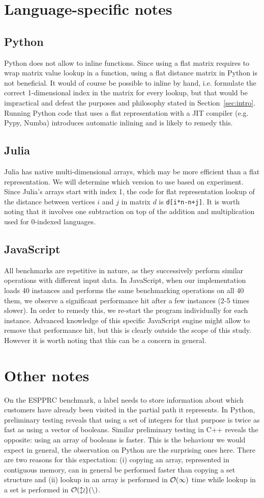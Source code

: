 \documentclass[11pt,a4paper,notitlepage]{article}
\begin{document}
\section{Language-specific notes}
\subsection{Python}
Python does not allow to inline functions. Since using a flat matrix
requires to wrap matrix value lookup in a function, using a flat distance
matrix in Python is not beneficial. It would of course be possible to
inline by hand, i.e. formulate the correct 1-dimensional index in the
matrix for every lookup, but that would be impractical and defeat the
purposes and philosophy stated in Section~\ref{sec:intro}.
Running Python code that uses a flat representation with a JIT compiler
(e.g. Pypy, Numba) introduces automatic inlining and is likely to
remedy this.
\subsection{Julia}
Julia has native multi-dimensional arrays, which may be more efficient
than a flat representation. We will determine which version to use
based on experiment. Since Julia's arrays start with index 1, the code
for flat representation lookup of the distance between vertices $i$
and $j$ in matrix $d$ is \lstinline{d[i*n-n+j]}. It is worth noting
that it involves one subtraction on top of the addition and
multiplication used for 0-indexed languages.
\subsection{JavaScript}
All benchmarks are repetitive in nature, as they successively perform similar
operations with different input data. In JavaScript, when our
implementation loads 40 instances and performs the same
benchmarking operations on all 40 them, we observe a significant performance
hit after a few instances (2-5 times slower). In order to remedy this,
we re-start the program individually for each instance. Advanced
knowledge of this specific JavaScript engine might allow to remove that
performance hit, but this is clearly outside the scope of this
study. However it is worth noting that this can be a concern in general.

\section{Other notes}
On the ESPPRC benchmark, a label needs to store information about
which customers have already been visited in the partial path it
represents. In Python, preliminary testing reveals that using a set of
integers for that purpose is twice as fast as using a vector of
booleans. Similar preliminary testing in C++ reveals the opposite:
using an array of booleans is faster. This is the behaviour we would
expect in general, the observation on Python are the surprising ones
here. There are two reasons for this expectation: (i) copying an array,
represented in contiguous memory, can in general be performed faster
than copying a set structure and (ii) lookup in an array is performed
in $\cal{O}(1)$ time while lookup in a set is performed in $\cal{O}(log(n)$.



\end{document}
